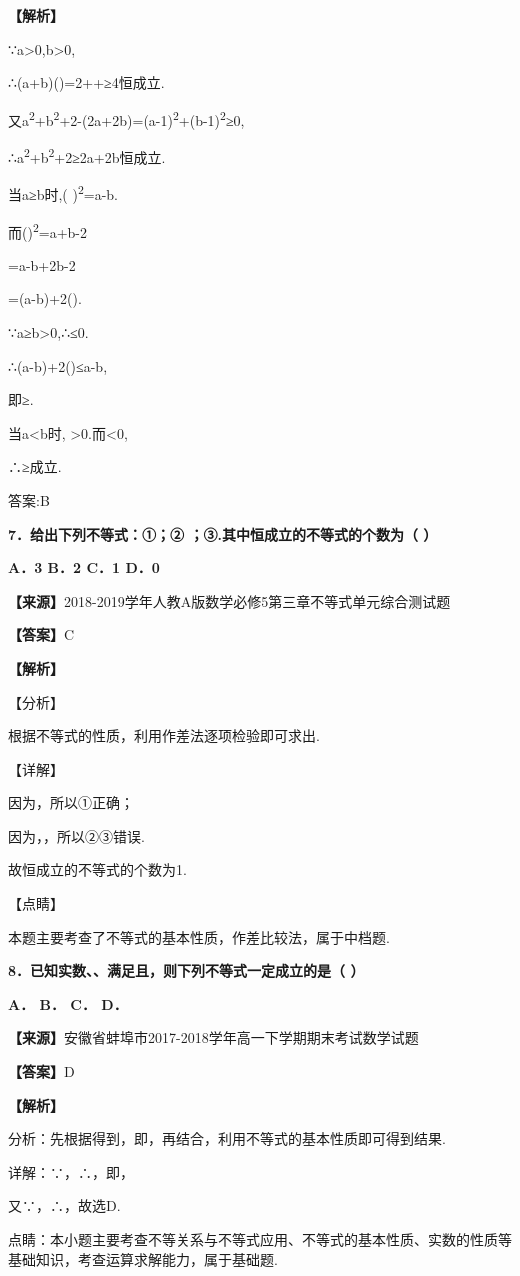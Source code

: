 \documentclass[
]{article}
\begin{document}
\textbf{【解析】}

∵a\textgreater0,b\textgreater0,

∴(a+b)()=2++≥4恒成立.

又a\textsuperscript{2}+b\textsuperscript{2}+2-(2a+2b)=(a-1)\textsuperscript{2}+(b-1)\textsuperscript{2}≥0,

∴a\textsuperscript{2}+b\textsuperscript{2}+2≥2a+2b恒成立.

当a≥b时,( )\textsuperscript{2}=a-b.

而()\textsuperscript{2}=a+b-2

=a-b+2b-2

=(a-b)+2().

∵a≥b\textgreater0,∴≤0.

∴(a-b)+2()≤a-b,

即≥.

当a\textless b时, \textgreater0.而\textless0,

∴≥成立.

答案:B

\textbf{7．给出下列不等式：①；② ；③.其中恒成立的不等式的个数为（ ）}

\textbf{A．3 B．2 C．1 D．0}

\textbf{【来源】}2018-2019学年人教A版数学必修5第三章不等式单元综合测试题

\textbf{【答案】}C

\textbf{【解析】}

【分析】

根据不等式的性质，利用作差法逐项检验即可求出.

【详解】

因为，所以①正确；

因为，，所以②③错误.

故恒成立的不等式的个数为1.

【点睛】

本题主要考查了不等式的基本性质，作差比较法，属于中档题.

\textbf{8．已知实数、、满足且，则下列不等式一定成立的是（ ）}

\textbf{A． B． C． D．}

\textbf{【来源】}安徽省蚌埠市2017-2018学年高一下学期期末考试数学试题

\textbf{【答案】}D

\textbf{【解析】}

分析：先根据得到，即，再结合，利用不等式的基本性质即可得到结果.

详解：∵，∴，即，

又∵，∴，故选D.

点睛：本小题主要考查不等关系与不等式应用、不等式的基本性质、实数的性质等基础知识，考查运算求解能力，属于基础题.
\end{document}
